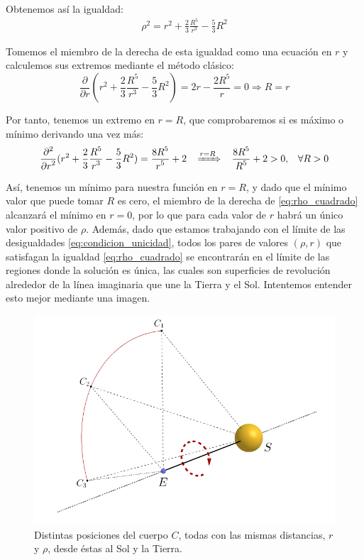 \documentclass[11pt]{article}
\newcommand\ddfrac[2]{\frac{\displaystyle #1}{\displaystyle #2}}
\begin{document}
Obtenemos así la igualdad:
\begin{align}
\rho^2=r^2+\ddfrac{2}{3}\ddfrac{R^5}{r^3}-\ddfrac{5}{3}R^2
\label{eq:rho_cuadrado}
\end{align}

Tomemos el miembro de la derecha de esta igualdad como una ecuación en $r$ y calculemos sus extremos mediante el método clásico:
\[
\ddfrac{\partial}{\partial r} (r^2+\ddfrac{2}{3}\ddfrac{R^5}{r^3}-\ddfrac{5}{3}R^2)=2r-\ddfrac{2R^5}{r}=0 \Longrightarrow R=r
\]

Por tanto, tenemos un extremo en $r=R$, que comprobaremos si es máximo o mínimo derivando una vez más:
\[
\ddfrac{\partial^2}{\partial r^2}(r^2+\ddfrac{2}{3}\ddfrac{R^5}{r^3}-\ddfrac{5}{3}R^2)=\ddfrac{8R^5}{r^5}+2
 \; \; \; \xRightarrow[]{r=R} \; \; \; \ddfrac{8R^5}{R^5}+2>0, \; \; \; \forall R>0
\]

Así, tenemos un mínimo para nuestra función en $r=R$, y dado que el mínimo valor que puede tomar $R$ es cero, el miembro de la derecha de \eqref{eq:rho_cuadrado} alcanzará el mínimo en $r=0$, por lo que para cada valor de $r$ habrá un único valor positivo de $\rho$. Además, dado que estamos trabajando con el límite de las desigualdades \eqref{eq:condicion_unicidad}, todos los pares de valores $(\rho,r)$ que satisfagan la igualdad \eqref{eq:rho_cuadrado} se encontrarán en el límite de las regiones donde la solución es única, las cuales son superficies de revolución alrededor de la línea imaginaria que une la Tierra y el Sol. Intentemos entender esto mejor mediante una imagen.
\begin{figure}[H]
\centering
\includegraphics[scale=0.4]{images/eje_rotacion.png}
\caption{Distintas posiciones del cuerpo $C$, todas con las mismas distancias, $r$ y $\rho$, desde éstas al Sol y la Tierra.}
\label{fig:eje_rotacion}
\end{figure}
\end{document}
